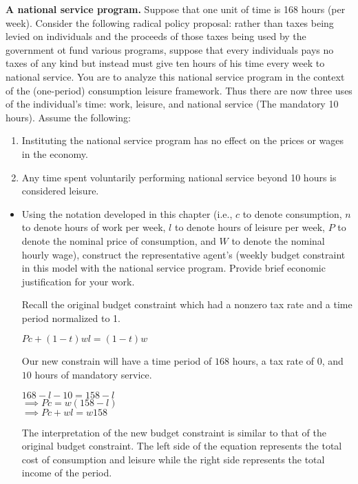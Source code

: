 \documentclass[11pt]{SelfArxOneColBMN}
\begin{document}
\begin{exercise}
	\textbf{A national service program.} Suppose that one unit of time is 168 hours (per week). Consider the following radical policy proposal: rather than taxes being levied on individuals and the proceeds of those taxes being used by the government ot fund various programs, suppose that every individuals pays no taxes of any kind but instead must give ten hours of his time every week to national service. You are to analyze this national service program in the context of the (one-period) consumption leisure framework. Thus there are now three uses of the individual's time: work, leisure, and national service (The mandatory 10 hours). Assume the following:
	\begin{enumerate}
		\item Instituting the national service program has no effect on the prices or wages in the economy.
		\item Any time spent voluntarily performing national service beyond 10 hours is considered leisure.
	\end{enumerate}
	\begin{itemize}
		\item Using the notation developed in this chapter (i.e., $c$ to denote consumption, $n$ to denote hours of work per week, $l$ to denote hours of leisure per week, $P$ to denote the nominal price of consumption, and $W$ to denote the nominal hourly wage), construct the representative agent's (weekly budget constraint in this model with the national service program. Provide brief economic justification for your work.
		\begin{solution}
			Recall the original budget constraint which had a nonzero tax rate and a time period normalized to 1.\\
			\begin{center}
				$Pc + (1 - t)wl = (1 - t)w$
			\end{center}
			Our new constrain will have a time period of $168$ hours, a tax rate of $0$, and $10$ hours of mandatory service.
			\begin{center}
				$168 - l - 10 = 158 - l$\\
				$\implies Pc = w(158 - l)$\\
				$\implies Pc + wl = w158$
			\end{center}
			The interpretation of the new budget constraint is similar to that of the original budget constraint. The left side of the equation represents the total cost of consumption and leisure while the right side represents the total income of the period. 

\end{solution}
\end{itemize}
\end{exercise}
\end{document}
